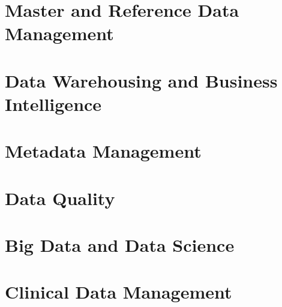 \chapter{Master and Reference Data Management}

\chapter{Data Warehousing and Business Intelligence}

\chapter{Metadata Management}

\chapter{Data Quality}

\chapter{Big Data and Data Science}

\chapter{Clinical Data Management}